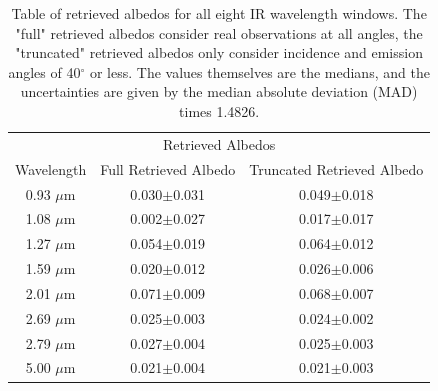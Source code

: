 \documentclass[twocolumn,linenumbers]{aastex631}
\begin{document}
\begin{table}[htbp]

\centering

\begin{tabular}{ccc}

\multicolumn{3}{c}{Retrieved Albedos} \\

Wavelength & Full Retrieved Albedo & Truncated Retrieved Albedo \\

\hline

0.93 $\mu$m & 0.030$\pm$0.031 & 0.049$\pm$0.018 \\

\hline

1.08 $\mu$m & 0.002$\pm$0.027 & 0.017$\pm$0.017 \\

\hline

1.27 $\mu$m & 0.054$\pm$0.019 & 0.064$\pm$0.012 \\

\hline

1.59 $\mu$m & 0.020$\pm$0.012 & 0.026$\pm$0.006 \\

\hline

2.01 $\mu$m & 0.071$\pm$0.009 & 0.068$\pm$0.007 \\

\hline

2.69 $\mu$m & 0.025$\pm$0.003 & 0.024$\pm$0.002 \\

\hline

2.79 $\mu$m & 0.027$\pm$0.004 & 0.025$\pm$0.003 \\

\hline

5.00 $\mu$m & 0.021$\pm$0.004 & 0.021$\pm$0.003 \\

\hline

\end{tabular}

\caption{Table of retrieved albedos for all eight IR wavelength windows. The "full" retrieved albedos consider real observations at all angles, the "truncated" retrieved albedos only consider incidence and emission angles of 40$^{\circ}$ or less. The values themselves are the medians, and the uncertainties are given by the median absolute deviation (MAD) times 1.4826.}

\label{table:theTable}

\end{table}
\end{document}
